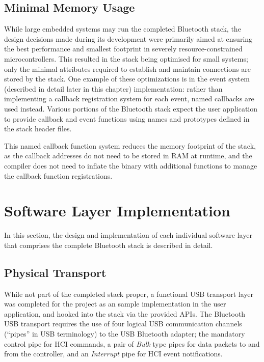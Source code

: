 \FloatBarrier
\subsection{Minimal Memory Usage}

While large embedded systems may run the completed Bluetooth stack, the design decisions made during its development were primarily aimed at ensuring the best performance and smallest footprint in severely resource-constrained microcontrollers. This resulted in the stack being optimised for small systems; only the minimal attributes required to establish and maintain connections are stored by the stack. One example of these optimizations is in the event system (described in detail later in this chapter) implementation: rather than implementing a callback registration system for each event, named callbacks are used instead. Various portions of the Bluetooth stack expect the user application to provide callback and event functions using names and prototypes defined in the stack header files.

This named callback function system reduces the memory footprint of the stack, as the callback addresses do not need to be stored in RAM at runtime, and the compiler does not need to inflate the binary with additional functions to manage the callback function registrations.

\section{Software Layer Implementation}

In this section, the design and implementation of each individual software layer that comprises the complete Bluetooth stack is described in detail.

\FloatBarrier
\subsection{Physical Transport}

While not part of the completed stack proper, a functional USB transport layer was completed for the project as an sample implementation in the user application, and hooked into the stack via the provided APIs. The Bluetooth USB transport \cite{bt2p1specs_usbtransport} requires the use of four logical USB communication channels (``pipes'' in USB terminology) to the USB Bluetooth adapter; the mandatory control pipe for HCI commands, a pair of \textit{Bulk} type pipes for data packets to and from the controller, and an \textit{Interrupt} pipe for HCI event notifications.

